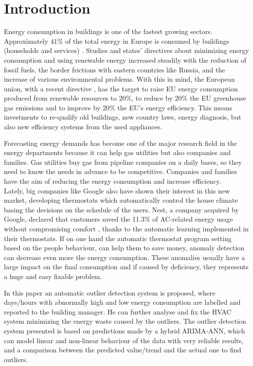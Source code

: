 \documentclass{sig-alternate-sigmod07}
\begin{document}

\section{Introduction}

Energy consumption in buildings is one of the fastest growing sectors. Approximately $41\%$ of the total energy in Europe is consumed by buildings (households and services) \cite{Eurostat2013}. Studies and states' directives about minimizing energy consumption and using renewable energy increased steadily with the reduction of fossil fuels, the border frictions with eastern countries like Russia, and the increase of various environmental problems. With this in mind, the European union, with a recent directive \cite{Directive2009}, has the target to raise EU energy consumption produced from renewable resources to $20\%$, to reduce by $20\%$ the EU greenhouse gas emissions and to improve by $20\%$ the EU's energy efficiency. This means investments to re-qualify old buildings, new country laws, energy diagnosis, but also new efficiency systems from the used appliances.

Forecasting energy demands has become one of the major research field in the energy departments because it can help gas utilities but also companies and families. Gas utilities buy gas from pipeline companies on a daily bases, so they need to know the needs in advance to be competitive.  Companies and families have the aim of reducing the energy consumption and increase efficiency. \\
Lately, big companies like Google also have shown their interest in this new market, developing thermostats which automatically control the house climate basing the decisions on the schedule of the users. Nest, a company acquired by Google, declared that customers saved the 11.3\% of AC-related energy usage without compromising comfort \cite{GoogleNest2}, thanks to the automatic learning implemented in their thermostats. If on one hand the automatic thermostat program setting based on the people behaviour, can help them to save money, anomaly detection can decrease even more the energy consumption. These anomalies usually have a large impact on the final consumption and if caused by deficiency, they represents a huge and easy fixable problem. 

In this paper an automatic outlier detection system is proposed, where days/hours with abnormally high and low energy consumption are labelled and reported to the building manager. He can further analyse and fix the HVAC system minimizing the energy waste caused by the outliers. The outlier detection system presented is based on predictions made by a hybrid ARIMA-ANN, which can model linear and non-linear behaviour of the data with very reliable results, and a comparison between the predicted value/trend and the actual one to find outliers. 
\end{document}
